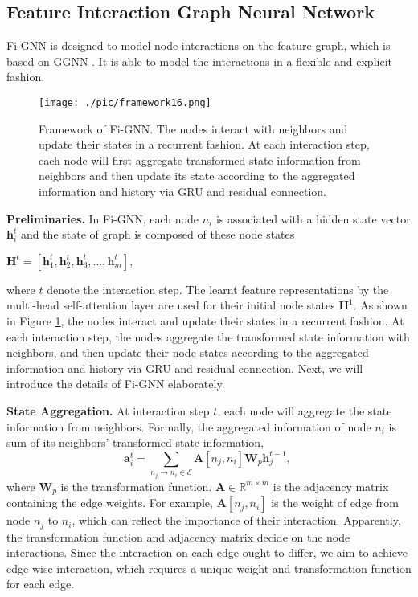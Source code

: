 \documentclass[sigconf]{acmart}
\begin{document}
\subsection{Feature Interaction Graph Neural Network}\label{sect:model} 
Fi-GNN is designed to model node interactions on the feature graph, which is based on GGNN \cite{li2015gated}.
It is able to model the interactions in a flexible and explicit fashion.

\begin{figure}[t]
\centering
\texttt{[image: ./pic/framework16.png]}
\caption{Framework of Fi-GNN. 
The nodes interact with neighbors and update their states in a recurrent fashion.
At each interaction step, each node will first aggregate transformed state information from neighbors and then update its state according to the aggregated information and history via GRU and residual connection.}
\label{fig:framework}
\end{figure}

\noindent \textbf{Preliminaries.}
In Fi-GNN, each node $n_{i}$ is associated with a hidden state vector $\mathbf{h}_{i}^{t}$ and the state of graph is composed of these node states
\begin{center}	
$\mathbf{H}^{t} = \left [ \mathbf{h}_{1}^{t}, \mathbf{h}_{2}^{t}, \mathbf{h}_{3}^{t}, ... ,
\mathbf {h}_{m}^{t} \right ],$
\end{center}
where $t$ denote the interaction step.
The learnt feature representations by the multi-head self-attention layer are used for their initial node states $\mathbf{H}^{1}$.
As shown in Figure \ref{fig:framework}, the nodes interact and update their states in a recurrent fashion. 
At each interaction step, the nodes aggregate the transformed state information with neighbors, and then update their node states according to the aggregated information and history via GRU and residual connection.
Next, we will introduce the details of Fi-GNN elaborately.




\noindent \textbf{State Aggregation.}
At interaction step $t$, each node will aggregate the state information from neighbors.
Formally, the aggregated information of node $n_{i}$ is sum of its neighbors' transformed state information,
\begin{equation} \label{ggnn_original}
\mathbf{a}_{i}^{t} = \sum_{n_{j} \rightarrow n_{i} \in \mathcal{E}} \mathbf{A}[n_{j}, n_{i}] \mathbf{W}_{p} \mathbf{h}_{j}^{t-1},~
\end{equation}
where $\mathbf{W}_{p}$ is the transformation function.
$\mathbf{A} \in \mathbb{R}^{m \times m}$ is the adjacency matrix containing the edge weights.
For example, $\mathbf{A}[n_{j}, n_{i}]$ is the weight of edge from node $n_{j}$ to $n_{i}$, which can reflect the importance of their interaction.
Apparently, the transformation function and adjacency matrix decide on the node interactions.
Since the interaction on each edge ought to differ, we aim to achieve edge-wise interaction, which requires a unique weight and transformation function for each edge.        
\end{document}
